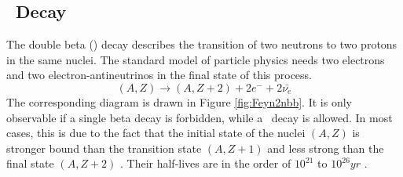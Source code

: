 \documentclass[encoding=utf8,british]{tumphthesis}
\begin{document}



\subsection{\onbb\ Decay}
\label{sec:0nubetabeta}

The double beta (\twonu) decay describes the transition of two neutrons to two protons in the same nuclei.
The standard model of particle physics needs two electrons and two electron-antineutrinos in the final state of this process.
\begin{equation}
(A,Z) \rightarrow (A,Z+2) + 2e^- + 2\bar{\nu_e}
\end{equation} 
The corresponding diagram is drawn in Figure \ref{fig:Feyn2nbb}.
It is only observable if a single beta decay is forbidden, while a \twonu\ decay is allowed.
In most cases, this is due to the fact that the initial state of the nuclei $(A,Z)$ is stronger bound than the transition state $(A,Z+1)$ and less strong than the final state $(A,Z+2)$ .
Their half-lives are in the order of $10^{21}$ to $10^{26} \unit{yr}$ \cite{shirai_double_2018,barabash_brief_2017}.
\\
\end{document}
